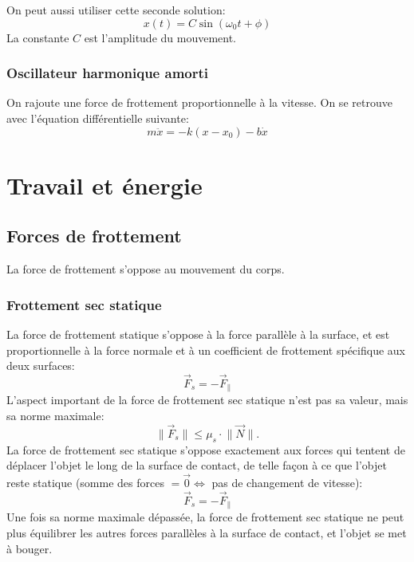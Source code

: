 \documentclass{article}
\numberwithin{equation}{section}
\providecommand{\norm}[1]{{\lVert#1\rVert}}
\begin{document}
On peut aussi utiliser cette seconde solution:
\begin{equation}
	\boxed{ x(t) = C \sin(\omega_0 t + \phi) }
\end{equation}
La constante \(C\) est l'amplitude du mouvement.

\subsubsection{Oscillateur harmonique amorti}
On rajoute une force de frottement proportionnelle à la vitesse. On se retrouve avec l'équation différentielle suivante:
\begin{equation}
	\boxed{ m \ddot x = - k(x - x_0) - b \dot x }
\end{equation}



\section{Travail et énergie}

\subsection{Forces de frottement}
La force de frottement s'oppose au mouvement du corps.

\subsubsection{Frottement sec statique}
La force de frottement statique s'oppose à la force parallèle à la surface, et est proportionnelle à la force normale et à un coefficient de frottement spécifique aux deux surfaces:
\begin{equation*}
	\vec F_s = - \vec F_\parallel
\end{equation*}
L'aspect important de la force de frottement sec statique n'est pas sa valeur, mais sa norme maximale:
\begin{equation}
	\boxed{\norm{\vec F_s} \leq \mu_s \cdot \norm{\vec N}.}
\end{equation}
La force de frottement sec statique s'oppose exactement aux forces qui tentent de déplacer l'objet le long de la surface de contact, de telle façon à ce que l'objet reste statique (somme des forces $= \vec 0 \iff$ pas de changement de vitesse):
\begin{equation}
	\vec F_s = -\vec F_{\parallel}
\end{equation}
Une fois sa norme maximale dépassée, la force de frottement sec statique ne peut plus équilibrer les autres forces parallèles à la surface de contact, et l'objet se met à bouger.
\end{document}
